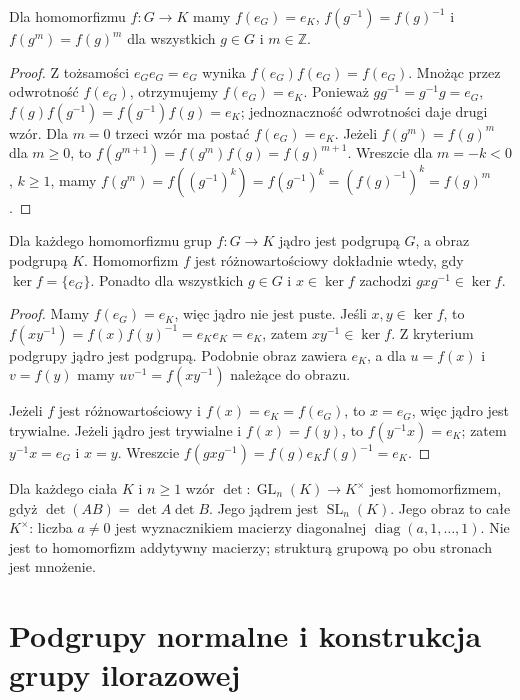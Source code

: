 \begin{lemat}
\label{aa:lem:hom-podstawy}
Dla homomorfizmu $f:G\to K$ mamy $f(e_G)=e_K$,
$f(g^{-1})=f(g)^{-1}$ i $f(g^m)=f(g)^m$
dla wszystkich $g\in G$ i $m\in\mathbb Z$.
\end{lemat}
\begin{proof}
Z tożsamości $e_Ge_G=e_G$ wynika
$f(e_G)f(e_G)=f(e_G)$. Mnożąc przez odwrotność
$f(e_G)$, otrzymujemy $f(e_G)=e_K$.
Ponieważ $gg^{-1}=g^{-1}g=e_G$,
$ f(g)f(g^{-1})=f(g^{-1})f(g)=e_K$;
jednoznaczność odwrotności daje drugi wzór.
Dla $m=0$ trzeci wzór ma postać $f(e_G)=e_K$.
Jeżeli $f(g^m)=f(g)^m$ dla $m\ge0$, to
$f(g^{m+1})=f(g^m)f(g)=f(g)^{m+1}$.
Wreszcie dla $m=-k<0$, $k\ge1$, mamy
$f(g^m)=f((g^{-1})^k)=f(g^{-1})^k=(f(g)^{-1})^k=f(g)^m$.
\end{proof}

\begin{twierdzenie}
\label{aa:tw:jadro-obraz}
Dla każdego homomorfizmu grup $f:G\to K$ jądro jest
podgrupą $G$, a obraz podgrupą $K$. Homomorfizm $f$
jest różnowartościowy dokładnie wtedy, gdy $\ker f=\{e_G\}$.
Ponadto dla wszystkich $g\in G$ i $x\in\ker f$
zachodzi $gxg^{-1}\in\ker f$.
\end{twierdzenie}
\begin{proof}
Mamy $f(e_G)=e_K$, więc jądro nie jest puste.
Jeśli $x,y\in\ker f$, to
$f(xy^{-1})=f(x)f(y)^{-1}=e_Ke_K=e_K$,
zatem $xy^{-1}\in\ker f$. Z kryterium podgrupy jądro jest podgrupą.
Podobnie obraz zawiera $e_K$, a dla
$u=f(x)$ i $v=f(y)$ mamy $uv^{-1}=f(xy^{-1})$
należące do obrazu.

Jeżeli $f$ jest różnowartościowy i $f(x)=e_K=f(e_G)$,
to $x=e_G$, więc jądro jest trywialne.
Jeżeli jądro jest trywialne i $f(x)=f(y)$,
to $f(y^{-1}x)=e_K$; zatem $y^{-1}x=e_G$ i $x=y$.
Wreszcie $f(gxg^{-1})=f(g)e_Kf(g)^{-1}=e_K$.
\end{proof}

\begin{przyklad}
Dla każdego ciała $K$ i $n\ge1$ wzór
$\det:\operatorname{GL}_n(K)\to K^\times$
jest homomorfizmem, gdyż $\det(AB)=\det A\det B$.
Jego jądrem jest $\operatorname{SL}_n(K)$.
Jego obraz to całe $K^\times$: liczba $a\ne0$
jest wyznacznikiem macierzy diagonalnej
$\operatorname{diag}(a,1,\ldots,1)$.
Nie jest to homomorfizm addytywny macierzy;
strukturą grupową po obu stronach jest mnożenie.
\end{przyklad}

\section{Podgrupy normalne i konstrukcja grupy ilorazowej}

